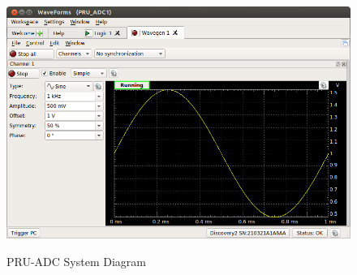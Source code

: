 		\begin{figure}[h]
			\centering
			\includegraphics[width=\textwidth]{photos/discovery2_waveform}
			\centering\bfseries
			\caption{PRU-ADC System Diagram}
		\end{figure}
		


	
	

